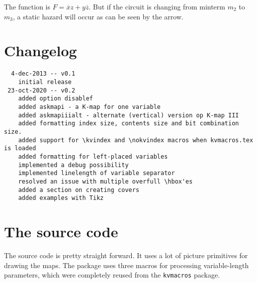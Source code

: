 \documentclass[a4paper,10pt]{ltxdoc}
\newcommand\Package[1]{\texttt{#1}}
\begin{document}
The function is $F = \overline{x}z + y\overline{z}$. But if the circuit is
changing from minterm $m_2$ to $m_3$, a static hazard will occur as can
be seen by the arrow.



\section{Changelog}
\label{sec:changelog}
\begin{verbatim}
  4-dec-2013 -- v0.1
    initial release
 23-oct-2020 -- v0.2
    added option disablef
    added askmapi - a K-map for one variable
    added askmapiiialt - alternate (vertical) version op K-map III
    added formatting index size, contents size and bit combination size.
    added support for \kvindex and \nokvindex macros when kvmacros.tex is loaded
    added formatting for left-placed variables
    implemented a debug possibility
    implemented linelength of variable separator
    resolved an issue with multiple overfull \hbox'es
    added a section on creating covers
    added examples with Tikz
\end{verbatim}


\newpage
\section{The source code}
\label{sec:sourcecode}
The source code is pretty straight forward. It uses a lot of picture primitives
for drawing the maps. The package uses three macros for processing
variable-length parameters, which were completely reused from the
\Package{kvmacros} package.


\end{document}
